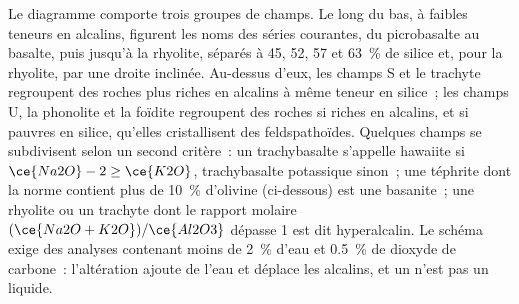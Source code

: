 Le diagramme comporte trois groupes de champs. Le long du bas, à faibles teneurs en alcalins,
figurent les noms des séries courantes, du picrobasalte au basalte, puis jusqu'à la rhyolite,
séparés à 45, 52, 57 et \qty{63}{\percent} de silice et, pour la rhyolite, par une droite
inclinée. Au-dessus d'eux, les champs S et le trachyte regroupent des roches plus riches en
alcalins à même teneur en silice~; les champs U, la phonolite et la foïdite regroupent des roches
si riches en alcalins, et si pauvres en silice, qu'elles cristallisent des feldspathoïdes.
Quelques champs se subdivisent selon un second critère~: un trachybasalte s'appelle hawaiite si $\ce{Na2O} - 2
\ge \ce{K2O}$, trachybasalte potassique sinon~; une téphrite dont la norme contient plus de
\qty{10}{\percent} d'olivine (ci-dessous) est une basanite~; une rhyolite ou un trachyte dont le
rapport molaire $(\ce{Na2O + K2O})/\ce{Al2O3}$ dépasse 1 est dit hyperalcalin. Le schéma exige des
analyses contenant moins de \qty{2}{\percent} d'eau et \qty{0.5}{\percent} de dioxyde de carbone~:
l'altération ajoute de l'eau et déplace les alcalins, et un  n'est pas un liquide.

